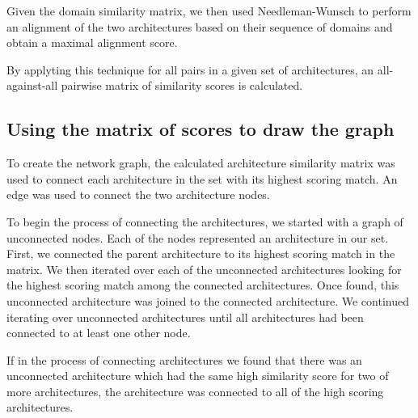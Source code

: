 Given the domain similarity matrix, we then used Needleman-Wunsch to perform an alignment of the two architectures based on their sequence of domains and obtain a maximal alignment score.

By applyting this technique for all pairs in a given set of architectures, an all-against-all pairwise matrix of similarity scores is calculated. 

\subsection{Using the matrix of scores to draw the graph}

To create the network graph, the calculated architecture similarity matrix was used to connect each architecture in the set with its highest scoring match. An edge was used to connect the two architecture nodes. 

To begin the process of connecting the architectures, we started with a graph of unconnected nodes. Each of the nodes represented an architecture in our set. First, we connected the parent architecture to its highest scoring match in the matrix. We then iterated over each of the unconnected architectures looking for the highest scoring match among the connected architectures. Once found, this unconnected architecture was joined to the connected architecture. We continued  iterating over unconnected architectures until all architectures had been connected to at least one other node.

If in the process of connecting architectures we found that there was an unconnected architecture which had the same high similarity score for two of more architectures, the architecture was connected to all of the high scoring architectures.


